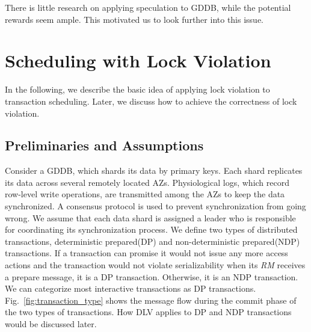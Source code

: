 \documentclass[conference]{IEEEtran}
\begin{document}
There is little research on applying speculation to GDDB, while the potential rewards seem ample. This motivated us to look further into this issue.


\section{Scheduling with Lock Violation}
\label{sec:non_strict}

In the following, we describe the basic idea of applying lock violation to transaction scheduling.
Later, we discuss how to achieve the correctness of lock violation.

\subsection{Preliminaries and Assumptions}
Consider a GDDB, which shards its data by primary keys.
Each shard replicates its data across several remotely located AZs.
Physiological logs, which record row-level write operations, are transmitted among the AZs to keep the data synchronized.
A consensus protocol is used to prevent synchronization from going wrong.
We assume that each data shard is assigned a leader who is responsible for coordinating its synchronization process.
We define two types of distributed transactions,  deterministic prepared(DP) and non-deterministic prepared(NDP) transactions.
If a transaction can promise it would not issue any more access actions and the transaction would not violate serializability when its \emph{RM} receives a prepare message, it is a DP transaction. Otherwise, it is an NDP transaction. 
We can categorize most interactive transactions as DP transactions.
Fig.~\ref{fig:transaction_type} shows the message flow during the commit phase of the two types of transactions.
How DLV applies to DP and NDP transactions would be discussed later.

\end{document}
